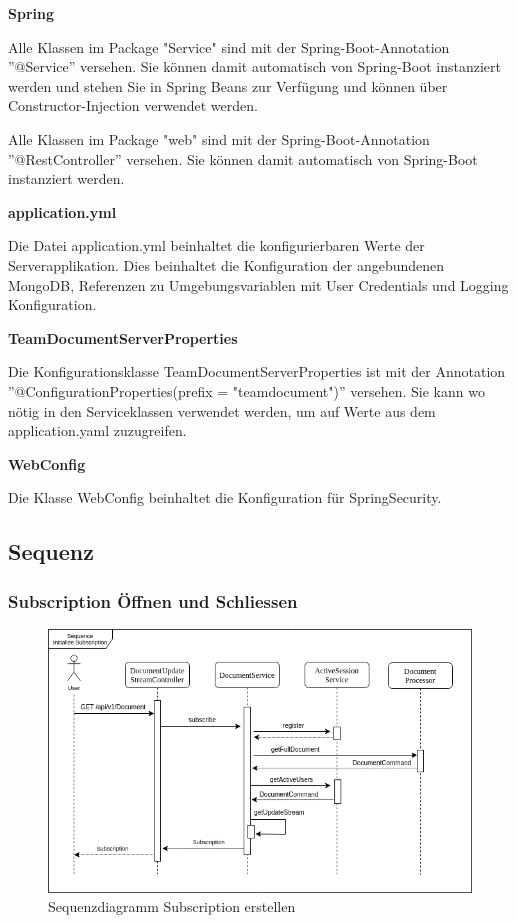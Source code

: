 \textbf{Spring}

Alle Klassen im Package "Service" sind mit der Spring-Boot-Annotation ''@Service'' versehen.
Sie können damit automatisch von Spring-Boot instanziert werden und stehen Sie in Spring Beans zur Verfügung und können über Constructor-Injection verwendet werden.

Alle Klassen im Package "web" sind mit der Spring-Boot-Annotation ''@RestController'' versehen.
Sie können damit automatisch von Spring-Boot instanziert werden.

\textbf{application.yml}

Die Datei application.yml beinhaltet die konfigurierbaren Werte der Serverapplikation.
Dies beinhaltet die Konfiguration der angebundenen MongoDB, Referenzen zu Umgebungsvariablen mit User Credentials und Logging Konfiguration.

\textbf{TeamDocumentServerProperties}

Die Konfigurationsklasse TeamDocumentServerProperties ist mit der Annotation ''@ConfigurationProperties(prefix = "teamdocument")'' versehen.
Sie kann wo nötig in den Serviceklassen verwendet werden, um auf Werte aus dem application.yaml zuzugreifen.

\textbf{WebConfig}

Die Klasse WebConfig beinhaltet die Konfiguration für SpringSecurity.

\clearpage

\subsection{Sequenz}

\subsubsection{Subscription Öffnen und Schliessen}

\begin{figure}[h]
    \centering
    \begin{minipage}[b]{1\textwidth}
        \includegraphics[width=\textwidth]{graphics/seq_init_subscription.drawio}
        \caption{Sequenzdiagramm Subscription erstellen}
    \end{minipage}
\end{figure}

